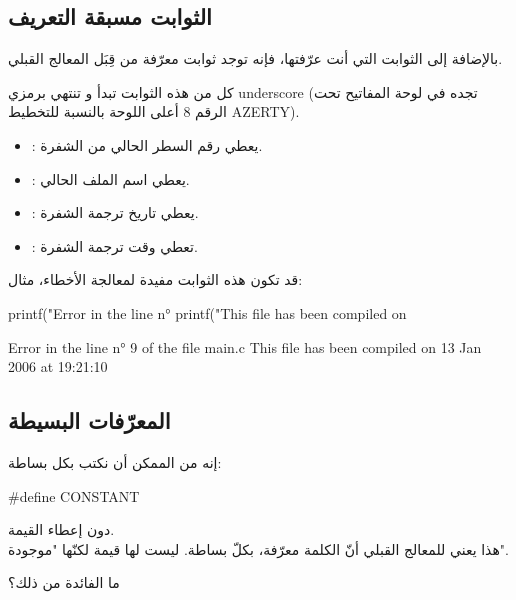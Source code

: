 \subsection{الثوابت مسبقة التعريف}

بالإضافة إلى الثوابت التي أنت عرّفتها، فإنه توجد ثوابت معرّفة من قِبَل المعالج القبلي.

كل من هذه الثوابت تبدأ و تنتهي برمزي
\textenglish{underscore} \InlineCode{\_}
(تجده في لوحة المفاتيح تحت الرقم 8 أعلى اللوحة بالنسبة للتخطيط
\textenglish{AZERTY}).

\begin{itemize}
  \item {}: يعطي رقم السطر الحالي من الشفرة.
  \item {}: يعطي اسم الملف الحالي.
  \item {}: يعطي تاريخ ترجمة الشفرة.
  \item {}: تعطي وقت ترجمة الشفرة.
\end{itemize}

قد تكون هذه الثوابت مفيدة لمعالجة الأخطاء، مثال:

\begin{Csource}
printf("Error in the line n° %
printf("This file has been compiled on %
\end{Csource}

\begin{Console}
Error in the line n° 9 of the file main.c
This file has been compiled on 13 Jan 2006 at 19:21:10
\end{Console}

\subsection{المعرّفات البسيطة}

إنه من الممكن أن نكتب بكل بساطة:

\begin{Csource}
#define CONSTANT
\end{Csource}

دون إعطاء القيمة.\\
هذا يعني للمعالج القبلي أنّ الكلمة
معرّفة، بكلّ بساطة. ليست لها قيمة لكنّها "موجودة".

\begin{question}
  ما الفائدة من ذلك؟
\end{question}

